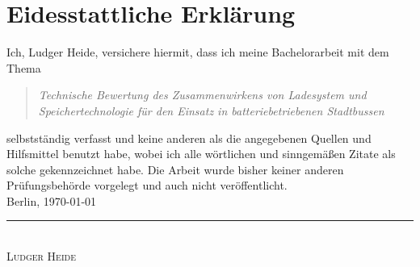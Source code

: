 \documentclass[toc=listof,toc=bib]{scrreprt}
\begin{document}



\chapter*{Eidesstattliche Erklärung}
Ich, Ludger Heide, versichere hiermit, dass ich meine Bachelorarbeit mit dem Thema
\begin{quote}
	\emph{Technische Bewertung des Zusammenwirkens von Ladesystem und Speichertechnologie für den Einsatz in batteriebetriebenen Stadtbussen}
\end{quote}
selbstständig verfasst und keine anderen als die angegebenen Quellen und Hilfsmittel benutzt habe, wobei ich alle wörtlichen und sinngemäßen Zitate als solche gekennzeichnet habe. Die Arbeit wurde bisher keiner anderen Prüfungsbehörde vorgelegt und auch nicht veröffentlicht.\\[6ex]
Berlin, \today\\
\newline
\rule{4cm}{0.5pt}\\
\textsc{Ludger Heide} 

\tableofcontents

\listoffigures

\listoftables
\newpage










 



\end{document}
